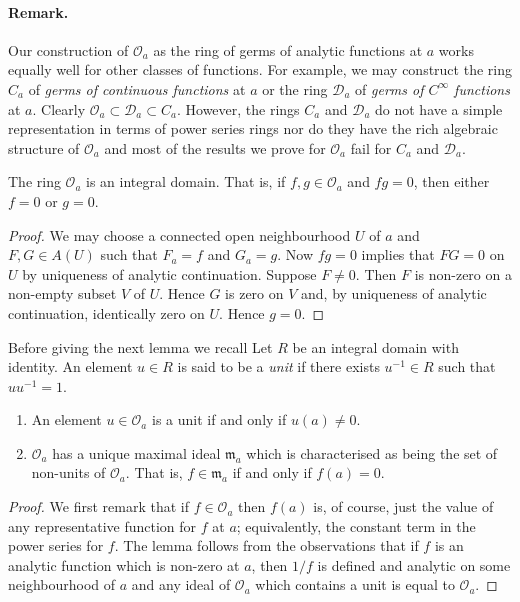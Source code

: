 \paragraph*{Remark.} Our construction of $\mathcal O_a$ as the ring of germs of analytic functions at $a$ works equally well for other classes of functions. For example, we may construct the ring $C_a$ of \emph{germs of continuous functions} at $a$ or the ring $\mathcal D_a$ of \emph{germs of $C^\infty$ functions} at $a$. Clearly $\mathcal O_a\subset\mathcal D_a\subset C_a$. However, the rings $C_a$ and $\mathcal D_a$ do not have a simple representation in terms of power series rings nor do they have the rich algebraic structure of $\mathcal O_a$ and most of the results we prove for $\mathcal O_a$ fail for $C_a$ and $\mathcal D_a$.

 The ring $\mathcal O_a$ is an integral domain. That is, if $f,g\in\mathcal O_a$ and $fg=0$, then either $f=0$ or $g=0$.
\begin{proof}
We may choose a connected open neighbourhood $U$ of $a$ and $F,G\in A(U)$ such that $F_a=f$ and $G_a=g$. Now $fg=0$ implies that $FG=0$ on $U$ by uniqueness of analytic continuation. Suppose $F\ne0$. Then $F$ is non-zero on a non-empty subset $V$ of $U$. Hence $G$ is zero on $V$ and, by uniqueness of analytic continuation, identically zero on $U$. Hence $g=0$.
\end{proof}
Before giving the next lemma we recall
 Let $R$ be an integral domain with identity. An element $u\in R$ is said to be a \emph{unit} if there exists $u^{-1}\in R$ such that $uu^{-1}=1$.
\begin{enumerate}
\item An element $u\in\mathcal O_a$ is a unit if and only if $u(a)\ne0$.
\item $\mathcal O_a$ has a unique maximal ideal $\mathfrak m_a$ which is characterised as being the set of non-units of $\mathcal O_a$. That is, $f\in\mathfrak m_a$ if and only if $f(a)=0$.
\end{enumerate}
\begin{proof}
We first remark that if $f\in\mathcal O_a$ then $f(a)$ is, of course, just the value of any representative function for $f$ at $a$; equivalently, the constant term in the power series for $f$. The lemma follows from the observations that if $f$ is an analytic function which is non-zero at $a$, then $1/f$ is defined and analytic on some neighbourhood of $a$ and any ideal of $\mathcal O_a$ which contains a unit is equal to $\mathcal O_a$.
\end{proof}
